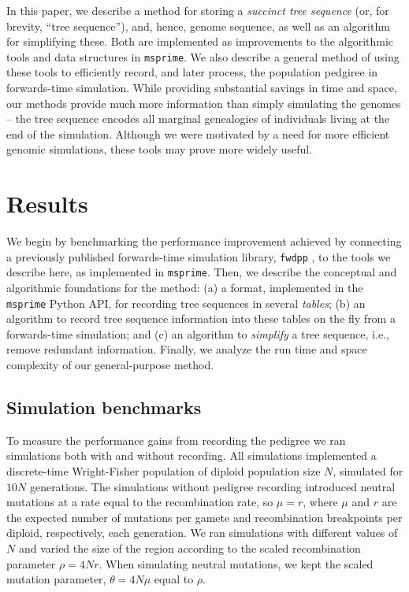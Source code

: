 \documentclass{article}
\newcommand{\fwdpp}{\texttt{fwdpp}}
\newcommand{\msprime}{\texttt{msprime}}
\begin{document}
In this paper, we describe a method for storing a \emph{succinct tree sequence} 
(or, for brevity, ``tree sequence''),
and, hence, genome sequence, as well as an algorithm for simplifying these.
Both are implemented as improvements to the algorithmic tools and data structures in \msprime{}.
We also describe a general method of using these tools to efficiently record,
and later process, the population pedgiree in forwards-time simulation.
While providing substantial savings in time and space, our methods provide much
more information than simply simulating the genomes -- the tree sequence
encodes all marginal genealogies of individuals living at the end of the simulation.
Although we were motivated by a need for more efficient genomic simulations,
these tools may prove more widely useful.


\section*{Results}


We begin by benchmarking the performance improvement achieved by connecting
a previously published forwards-time simulation library,
\fwdpp{} \citep{fwdpp},
to the tools we describe here, as implemented in \msprime{}.
Then, we describe the conceptual and algorithmic foundations for the method:
(a) a format, implemented in the \msprime{} Python API,
for recording tree sequences in several \emph{tables};
(b) an algorithm to record tree sequence information into these tables on the fly
    from a forwards-time simulation;
and (c) an algorithm to \emph{simplify} a tree sequence, i.e., remove redundant information.
Finally, we analyze the run time and space complexity of our general-purpose method.


\subsection*{Simulation benchmarks}

To measure the performance gains from recording the pedigree we ran simulations both with and without recording.
All simulations implemented a discrete-time Wright-Fisher population of diploid
population size $N$, simulated for $10N$ generations.
The simulations without pedigree recording introduced neutral mutations at a rate
equal to the recombination rate,
so $\mu = r$, where $\mu$ and $r$ are the expected number of mutations per gamete and recombination breakpoints per
diploid,
respectively, each generation.
We ran simulations with different values of $N$ and varied the size of the region according to the scaled recombination
parameter $\rho = 4Nr$.  When simulating neutral mutations, we kept the scaled mutation parameter, $\theta = 4N\mu$
equal to $\rho$.
\end{document}
